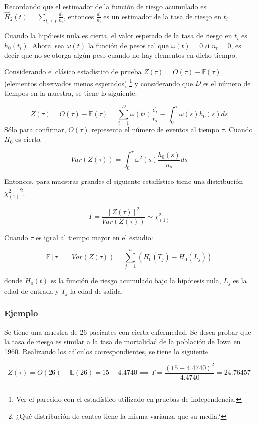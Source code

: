 \documentclass[
  a4paper,
  oneside,
  openany]{book}
\begin{document}
Recordando que el estimador de la función de riesgo acumulado es \(\hat{H}_2(t) = \sum_{t_{i}\leq t}\frac{d_i}{n_i}\), entonces \(\frac{d_i}{n_i}\) es un estimador de la tasa de riesgo en \(t_i\).

Cuando la hipótesis nula es cierta, el valor esperado de la tasa de riesgo en \(t_i\) es \(h_0(t_i)\). Ahora, sea \(\omega(t)\) la función de pesos tal que \(\omega(t) = 0\) si \(n_t = 0\), es decir que no se otorga algún peso cuando no hay elementos en dicho tiempo.

Considerando el clásico estadístico de prueba \(Z(\tau) = O(\tau)-\mathbb{E}(\tau)\) (elementos observados menos esperados) \footnote{Ver el parecido con el estadístico utilizado en pruebas de independencia.} y considerando que \(D\) es el número de tiempos en la muestra, se tiene lo siguiente:

\[
Z(\tau) = O(\tau)-\mathbb{E}(\tau) = \sum_{i = 1}^D\omega(ti)\frac{d_i}{n_i}-\int_0^{\tau}\omega(s)h_0(s)ds
\]
Sólo para confirmar, \(O(\tau)\) representa el número de eventos al tiempo \(\tau\). Cuando \(H_0\) es cierta

\[
Var(Z(\tau)) = \int_0^{\tau}\omega^2(s)\frac{h_0(s)}{n_s}ds
\]

Entonces, para muestras grandes el siguiente estadístico tiene una distribución \(\chi^2_{(1)}\)\footnote{¿Qué distribución de conteo tiene la misma varianza que su media?}.

\[
T = \frac{[Z(\tau)]^2}{Var(Z(\tau))}\sim\chi^2_{(1)}
\]

Cuando \(\tau\) es igual al tiempo mayor en el estudio:

\[
\mathbb{E}[\tau] = Var(Z(\tau)) = \sum_{j = 1}^n\left(H_0(T_j)-H_0(L_j)\right)
\]

donde \(H_0(t)\) es la función de riesgo acumulado bajo la hipótesis nula, \(L_j\) es la edad de entrada y \(T_j\) la edad de salida.

\hypertarget{ejemplo-15}{%
\subsubsection*{Ejemplo}\label{ejemplo-15}}


Se tiene una muestra de 26 pacientes con cierta enfermedad. Se desea probar que la tasa de riesgo es similar a la tasa de mortalidad de la población de Iowa en 1960. Realizando los cálculos correspondientes, se tiene lo siguiente

\[
Z(\tau) = O(26)-\mathbb{E}(26) = 15-4.4740\implies T=\frac{(15-4.4740)^2}{4.4740} = 24.76457
\]
\end{document}

